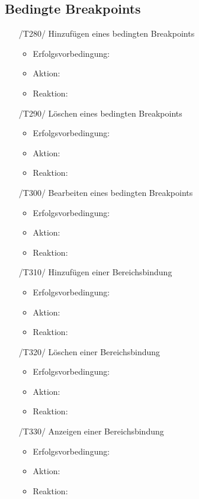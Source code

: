 \documentclass[parskip=full]{scrartcl}
\begin{document}
\subsection{Bedingte Breakpoints}

\begin{itemize}

	\item[/T280/] Hinzufügen eines bedingten Breakpoints
		\begin{itemize}
		\item Erfolgsvorbedingung:
		\item Aktion:
		\item Reaktion:		
		\end{itemize}	
	
	\item[/T290/] Löschen eines bedingten Breakpoints
		\begin{itemize}
		\item Erfolgsvorbedingung:
		\item Aktion:
		\item Reaktion:		
		\end{itemize}	
	
	\item[/T300/] Bearbeiten eines bedingten Breakpoints
		\begin{itemize}
		\item Erfolgsvorbedingung:
		\item Aktion:
		\item Reaktion:		
		\end{itemize}	
	
	\item[/T310/] Hinzufügen einer Bereichsbindung
		\begin{itemize}
		\item Erfolgsvorbedingung:
		\item Aktion:
		\item Reaktion:		
		\end{itemize}	
	
	\item[/T320/] Löschen einer Bereichsbindung
		\begin{itemize}
		\item Erfolgsvorbedingung:
		\item Aktion:
		\item Reaktion:		
		\end{itemize}	
	
	\item[/T330/] Anzeigen einer Bereichsbindung
		\begin{itemize}
		\item Erfolgsvorbedingung:
		\item Aktion:
		\item Reaktion:		
		\end{itemize}	
	
		
\end{itemize}
\end{document}
